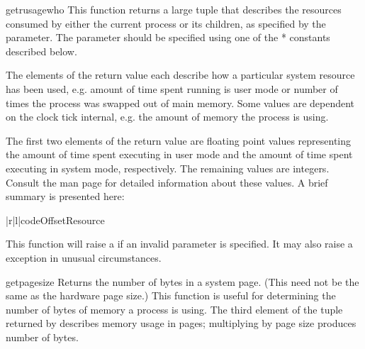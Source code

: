 \begin{funcdesc}{getrusage}{who}
  This function returns a large tuple that describes the resources
  consumed by either the current process or its children, as specified
  by the  parameter.  The  parameter should be
  specified using one of the * constants described
  below.

  The elements of the return value each
  describe how a particular system resource has been used, e.g. amount
  of time spent running is user mode or number of times the process was
  swapped out of main memory. Some values are dependent on the clock
  tick internal, e.g. the amount of memory the process is using.

  The first two elements of the return value are floating point values
  representing the amount of time spent executing in user mode and the
  amount of time spent executing in system mode, respectively. The
  remaining values are integers. Consult the  man page
  for detailed information about these values. A brief summary is
  presented here:

\begin{tableii}{|r|l|}{code}{Offset}{Resource}
\end{tableii}

  This function will raise a  if an invalid 
  parameter is specified. It may also raise a 
  exception in unusual circumstances.
\end{funcdesc}

\begin{funcdesc}{getpagesize}{}
  Returns the number of bytes in a system page. (This need not be the
  same as the hardware page size.) This function is useful for
  determining the number of bytes of memory a process is using. The
  third element of the tuple returned by  describes
  memory usage in pages; multiplying by page size produces number of
  bytes. 
\end{funcdesc}


